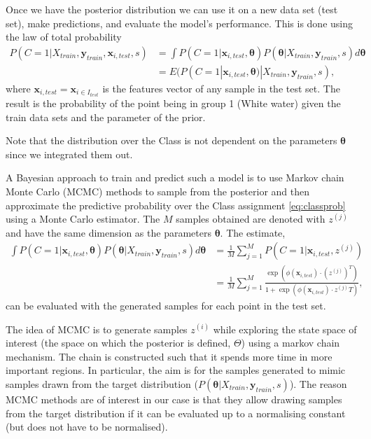    Once we have the posterior distribution we can use it on a new data set (test set), make predictions, and evaluate the model's performance. This is done using the law of total probability 
   \begin{align}
		P({C} = 1|X_{train},\mathbf{y}_{train},\mathbf{x}_{i,test},s) &= \int P(C=1|\mathbf{x}_{i,test},\bm{\theta})P(\bm{\theta}|X_{train},\mathbf{y}_{train},s) d\bm{\theta}\label{eq:classprob} \\
		&= E(P(C=1|\mathbf{x}_{i,test},\bm{\theta})|X_{train},\mathbf{y}_{train},s),
   \end{align}
   where $\mathbf{x}_{i,test}=\mathbf{x}_{i \in I_{test}} $ is the features vector of any sample in the test set.  The result is the probability of the point being in group 1 (White water) given the train data sets and the parameter of the prior.

   Note that the distribution over the Class is not dependent on the parameters $\bm{\theta}$ since we integrated them out.
   
   A Bayesian approach to train and predict such a model is to use Markov chain Monte Carlo (MCMC) methods to sample from the posterior and then approximate the predictive probability over the Class assignment \eqref{eq:classprob} using a Monte Carlo estimator. The $M$ samples obtained are denoted with $z^{(j)}$ and have the same dimension as the parameters $\bm{\theta}$. The estimate,
   \begin{align}
   	\int P(C=1|\mathbf{x}_{i,test},\bm{\theta}) P(\bm{\theta}|X_{train},\mathbf{y}_{train},s) d\bm{\theta} &= \frac{1}{M}\sum_{j=1}^M P(C=1|\mathbf{x}_{i,test},z^{(j)}) \\
   	&= \frac{1}{M}\sum_{j=1}^M  \frac{\exp(\phi(\mathbf{x}_{i,test}) \cdot(z^{(j)})^T)}{1+\exp(\phi( \mathbf{x}_{i,test}) \cdot z^{(j)}T)},
   \end{align} 
   can be evaluated with the generated samples for each point in the test set.
   
   
   The idea of MCMC is to generate samples $z^{(i)}$ while exploring the state space of interest (the space on which the posterior is defined, $\Theta$) using a markov chain mechanism. The chain is constructed such that it spends more time in more important regions. In particular, the aim is for the samples generated to mimic samples drawn from the target distribution ($P(\bm{\theta}|X_{train},\mathbf{y}_{train},s)$).
   The reason MCMC methods are of interest in our case is that they allow drawing samples from the target distribution if it can be evaluated up to a normalising constant (but does not have to be normalised). 
   
